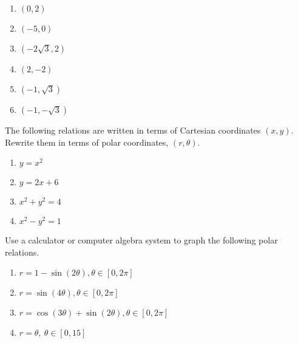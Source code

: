 \begin{enumialphparenastyle}
\begin{ex}
\begin{enumerate}
\item $\left( 0,2\right) $

\item $\left( -5,0\right) $

\item $\left( -2\sqrt{3},2\right) $

\item $\left( 2,-2\right) $

\item $\left( -1,\sqrt{3}\right) $

\item $\left( -1,-\sqrt{3}\right) $
\end{enumerate}
\end{ex}

\begin{ex} The following relations are written in terms of Cartesian coordinates $\left(x, y \right)$. Rewrite them in terms of polar coordinates, $\left( r, \theta \right)$. 

\begin{enumerate}
\item $y=x^{2}$

\item $y=2x+6$

\item $x^{2}+y^{2}=4$

\item $x^{2}-y^{2}=1$
\end{enumerate}
\end{ex}

\begin{ex} Use a calculator or computer algebra system to graph the following
polar relations.

\begin{enumerate}
\item $r=1-\sin \left( 2\theta \right) ,\theta \in \left[ 0,2\pi \right] $

\item $r=\sin \left( 4\theta \right) ,\theta \in \left[ 0,2\pi \right] $ 

\item $r=\cos \left( 3\theta \right) +\sin \left( 2\theta \right) ,\theta
\in \left[ 0,2\pi \right] $

\item $r=\theta ,\ \theta \in \left[ 0,15\right] $
\end{enumerate}
\end{ex}


\end{enumialphparenastyle}
